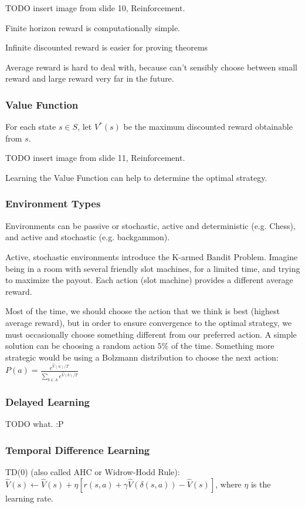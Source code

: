TODO insert image from slide 10, Reinforcement.

Finite horizon reward is computationally simple.

Infinite discounted reward is easier for proving theorems

Average reward is hard to deal with, because can't sensibly choose between
small reward and large reward very far in the future.

\subsubsection{Value Function}
For each state $s \in S$, let $V^*(s)$ be the maximum discounted reward
obtainable from $s$.

TODO insert image from slide 11, Reinforcement.

Learning the Value Function can help to determine the optimal strategy.

\subsubsection{Environment Types}

Environments can be passive or stochastic, active and deterministic (e.g.
Chess), and active and stochastic (e.g. backgammon).

Active, stochastic environments introduce the K-armed Bandit Problem. Imagine
being in a room with several friendly slot machines, for a limited time, and
trying to maximize the payout. Each action (slot machine) provides a different
average reward.

Most of the time, we should choose the action that we think is best (highest
average reward), but in order to ensure convergence to the optimal strategy, we
must occasionally choose something different from our preferred action. A
simple solution can be choosing a random action $5\%$ of the time. Something
more strategic would be using a Bolzmann distribution to choose the next
action: $P(a) = \frac{e^{\hat{V}(a)/T}}{\sum_{b \in A} e^{\hat{V}(b)/T}}$

\subsubsection{Delayed Learning}
TODO what. :P

\subsubsection{Temporal Difference Learning}
TD(0) (also called AHC or Widrow-Hodd Rule): $\hat{V}(s) \leftarrow \hat{V}(s)
+ \eta[r(s,a) + \gamma\hat{V}(\delta(s,a)) - \hat{V}(s)]$, where $\eta$ is the
learning rate.

